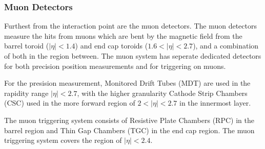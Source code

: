 \subsubsection{Muon Detectors}

Furthest from the interaction point are the muon detectors. 
The muon detectors measure the hits from muons which are bent by the magnetic field from the barrel toroid ($|\eta|<1.4$) and end cap toroids ($1.6<|\eta|<2.7$), and a combination of both in the region between. 
The muon system has seperate dedicated detectors for both precision position measurements and for triggering on muons.

For the presision measurement, Monitored Drift Tubes (MDT) are used in the rapidity range $|\eta|<2.7$, with the higher granularity Cathode Strip Chambers (CSC) used in the more forward region of $2<|\eta|<2.7$ in the innermost layer. 

The muon triggering system consists of Resistive Plate Chambers (RPC) in the barrel region and Thin Gap Chambers (TGC) in the end cap region. 
The muon triggering system covers the region of $|\eta|<2.4$. 


